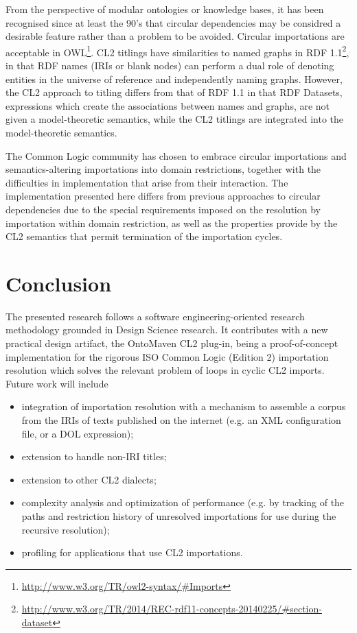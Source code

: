 \documentclass{IOS-Book-Article}
\begin{document}
From the perspective of modular ontologies or knowledge bases, it has been recognised since at least the 90's\cite{farquhar1997tools} that
circular dependencies may be considred a desirable feature rather than a problem to be avoided. Circular importations are acceptable in OWL\footnote{\url{http://www.w3.org/TR/owl2-syntax/#Imports}}. CL2 titlings have similarities to named graphs in RDF 1.1\footnote{\url{http://www.w3.org/TR/2014/REC-rdf11-concepts-20140225/#section-dataset}}, 
in that RDF names (IRIs or blank nodes) can perform a dual role of denoting entities in the universe of reference and independently naming graphs.
However, the CL2 approach to titling differs from that of RDF 1.1 in that RDF Datasets, expressions which create the associations between names and graphs, 
 are not given a model-theoretic semantics, while the CL2 titlings are integrated into the model-theoretic semantics.


The Common Logic community has chosen to embrace
circular importations and semantics-altering importations into domain restrictions, together with the difficulties in implementation that 
arise from their interaction. The implementation presented here differs from previous approaches to circular dependencies due to the special requirements
imposed on the resolution by importation within domain restriction, as well as the properties provide by the CL2 semantics that permit termination of the importation cycles.

\section{Conclusion}
The presented research follows a software engineering-oriented research methodology grounded in Design Science research. It contributes with a new practical design artifact, the OntoMaven CL2 plug-in, being a proof-of-concept implementation for the rigorous ISO Common Logic (Edition 2) importation resolution which solves the relevant problem of loops in cyclic CL2 imports. 
Future work will include
\begin{itemize}
\item integration of importation resolution with a mechanism to assemble a corpus from the IRIs of texts published on the internet (e.g. an XML configuration file, or a DOL\cite{DOL2012} expression);
\item extension to handle non-IRI titles;
\item extension to other CL2 dialects;
\item  complexity analysis and optimization of performance (e.g. by tracking of the paths and restriction history of unresolved importations for use during the recursive resolution);
\item profiling for applications that use CL2 importations.
\end{itemize}
\end{document}
